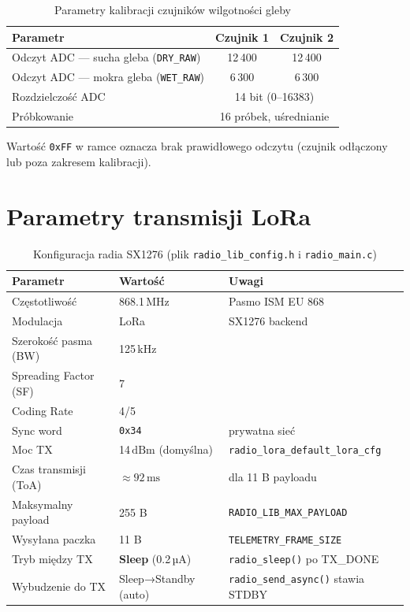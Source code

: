 \documentclass[12pt,a4paper]{article}
\newcommand{\qty}[2]{#1\,\ensuremath{#2}}
\newcommand{\mega}{\mathrm{M}}
\newcommand{\kilo}{\mathrm{k}}
\newcommand{\milli}{\mathrm{m}}
\newcommand{\hertz}{\mathrm{Hz}}
\newcommand{\second}{\mathrm{s}}
\newcommand{\dBm}{\mathrm{dBm}}
\begin{document}
\begin{table}[H]
\centering
\caption{Parametry kalibracji czujników wilgotności gleby}
\begin{tabular}{lcc}
\toprule
Parametr & Czujnik 1 & Czujnik 2 \\
\midrule
Odczyt ADC — sucha gleba (\texttt{DRY\_RAW})  & 12\,400 & 12\,400 \\
Odczyt ADC — mokra gleba (\texttt{WET\_RAW})  & 6\,300  & 6\,300  \\
Rozdzielczość ADC & \multicolumn{2}{c}{14 bit (0–16383)} \\
Próbkowanie & \multicolumn{2}{c}{16 próbek, uśrednianie} \\
\bottomrule
\end{tabular}
\end{table}

Wartość \texttt{0xFF} w ramce oznacza brak prawidłowego odczytu
(czujnik odłączony lub poza zakresem kalibracji).

\section{Parametry transmisji LoRa}

\begin{table}[H]
\centering
\caption{Konfiguracja radia SX1276 (plik \texttt{radio\_lib\_config.h}
         i \texttt{radio\_main.c})}
\begin{tabular}{lll}
\toprule
\textbf{Parametr}         & \textbf{Wartość}          & \textbf{Uwagi} \\
\midrule
Częstotliwość             & \qty{868.1}{\mega\hertz}  & Pasmo ISM EU 868 \\
Modulacja                 & LoRa                       & SX1276 backend \\
Szerokość pasma (BW)      & \qty{125}{\kilo\hertz}     & \\
Spreading Factor (SF)     & 7                          & \\
Coding Rate               & 4/5                        & \\
Sync word                 & \texttt{0x34}              & prywatna sieć \\
Moc TX                    & \qty{14}{\dBm} (domyślna) & \texttt{radio\_lora\_default\_lora\_cfg} \\
Czas transmisji (ToA)     & $\approx\qty{92}{\milli\second}$ & dla 11 B payloadu \\
Maksymalny payload        & 255 B                      & \texttt{RADIO\_LIB\_MAX\_PAYLOAD} \\
Wysyłana paczka           & 11 B                       & \texttt{TELEMETRY\_FRAME\_SIZE} \\
Tryb między TX            & \textbf{Sleep} (0.2\,µA)  & \texttt{radio\_sleep()} po TX\_DONE \\
Wybudzenie do TX          & Sleep→Standby (auto)       & \texttt{radio\_send\_async()} stawia STDBY \\
\bottomrule
\end{tabular}
\end{table}
\end{document}
